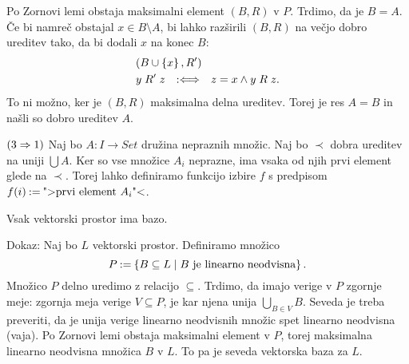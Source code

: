 \begin{dokaz}
  Po Zornovi lemi obstaja maksimalni element $(B,R)$ v $P$. Trdimo, da je $B = A$. Če bi namreč
  obstajal $x \in B \setminus A$, bi lahko razširili $(B,R)$ na večjo dobro ureditev tako, da bi dodali $x$
  na konec $B$:
  \begin{align*}
    & (B \cup \left\{x\right\}, R') \\
    & y \mathrel{R'} z \quad {{:}{\Longleftrightarrow}}\quad z = x \land y \mathrel{R} z.
  \end{align*}
  To ni možno, ker je $(B,R)$ maksimalna delna ureditev. Torej je res $A = B$ in
  našli so dobro ureditev $A$.

  $(3 \Rightarrow 1)$ Naj bo $A : I \to Set$ družina nepraznih množic. Naj bo $\prec$ dobra ureditev
  na uniji $\bigcup A$. Ker so vse množice $A_i$ neprazne, ima vsaka od njih prvi element
  glede na $\prec$. Torej lahko definiramo funkcijo izbire $f$ s predpisom
  $f(i) \mathbin{{:}{=}} \text{">prvi element $A_i$"<}$.
\end{dokaz}

\begin{izrek}
  Vsak vektorski prostor ima bazo.
\end{izrek}

\begin{dokaz}
  Dokaz: Naj bo $L$ vektorski prostor. Definiramo množico
  \begin{equation*}
    P \mathbin{{:}{=}} \left\{ B \subseteq L \mid \text{$B$ je linearno neodvisna} \right\}.
  \end{equation*}
  Množico $P$ delno uredimo z relacijo $\subseteq$. Trdimo, da imajo verige v $P$ zgornje
  meje: zgornja meja verige $V \subseteq P$, je kar njena unija $\bigcup_{B \in V} B$. Seveda je
  treba preveriti, da je unija verige linearno neodvisnih množic spet linearno
  neodvisna (vaja). Po Zornovi lemi obstaja maksimalni element v $P$, torej
  maksimalna linearno neodvisna množica $B$ v $L$. To pa je seveda vektorska baza
  za $L$.
\end{dokaz}